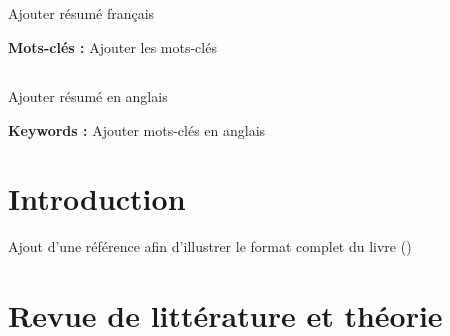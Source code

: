 \documentclass[
  12pt,
  letterpaper,
]{report}
\renewcommand*\contentsname{Table des matières}
\newcommand\contentsname{Table des matières}
\begin{document}
\section*{}
\begin{spacing}{1}

Ajouter résumé français

\end{spacing}
\vspace{1cm}

\noindent \textbf{Mots-clés :} Ajouter les mots-clés \clearpage

\section*{}

\begin{spacing}{1}

Ajouter résumé en anglais

\end{spacing}
\vspace{1cm}

\noindent \textbf{Keywords :} Ajouter mots-clés en anglais \clearpage

\renewcommand*\contentsname{Table des matières}
{
\hypersetup{linkcolor=}
\setcounter{tocdepth}{3}
\tableofcontents
}
\listoffigures
\listoftables


\chapter{}\label{section}


\chapter{Introduction}\label{introduction}

Ajout d'une référence afin d'illustrer le format complet du livre
()


\chapter{Revue de littérature et
théorie}\label{revue-de-littuxe9rature-et-thuxe9orie}

\end{document}
